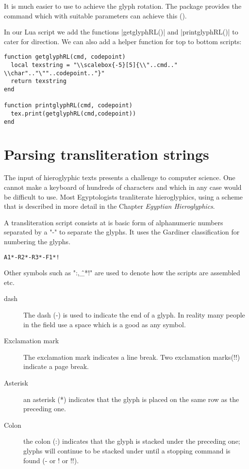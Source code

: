 \begin{macro}{\scalebox}
It is much easier to use \tex to achieve the glyph rotation. The package  provides the command \cmd{\scalebox} which with suitable parameters can achieve this ().
\end{macro}

In our Lua script we add the functions |getglyphRL()| and |printglyphRL()| to cater for direction. We can also add a helper function for top to bottom scripts:

\begin{verbatim}
function getglyphRL(cmd, codepoint)
  local texstring = "\\scalebox{-5}[5]{\\"..cmd.." \\char".."\""..codepoint.."}"
  return texstring
end

function printglyphRL(cmd, codepoint)
  tex.print(getglyphRL(cmd,codepoint))
end
\end{verbatim}

\section{Parsing transliteration strings}

The input of hieroglyphic texts presents a challenge to computer science. One cannot make a keyboard of hundreds of characters and which in any case would be difficult to use. 
Most Egyptologists tranliterate hieroglyphics, using a scheme that is described in more detail in the Chapter \textit{Egyptian Hieroglyphics}.

A transliteration script consists at is basic form of alphanumeric numbers separated by a "-" to separate the glyphs. It uses the Gardiner classification for numbering the glyphs.

\begin{center}
\texttt{A1*-R2*-R3*-F1*!}
\end{center}

Other symbols such as ":,\^\_*!" are used to denote how the scripts are assembled etc.

\begin{description}
\item [dash]
The dash (-) is used to indicate the end of a glyph. In reality many people in the field use a space which is a good as any symbol. 
\item [Exclamation mark] The exclamation mark indicates a line break. Two exclamation marks(!!) indicate a page break.

\item [Asterisk] an asterisk (*) indicates that the glyph is placed on the same row as the preceding one.

\item[Colon] the colon (:) indicates that the glyph is stacked under the preceding one; glyphs will continue to be stacked under until a stopping command is found (- or ! or !!).

\end{description}

